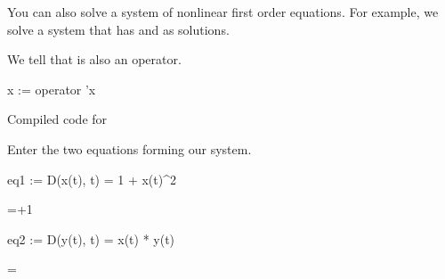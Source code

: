 {{{{{{{{{{{{{{{{You can also solve a system of nonlinear first order equations.
For example, we solve a system that has  and
 as solutions.

\begin{xtc}
\begin{xtccomment}
We tell \Language{} that  is also an operator.
\end{xtccomment}
\begin{spadsrc}
x := operator 'x
\end{spadsrc}
\begin{MessageOutput}
   Compiled code for %
\end{MessageOutput}
\begin{TeXOutput}
\begin{fricasmath}{4}
%
\end{fricasmath}
\end{TeXOutput}
\end{xtc}
\begin{xtc}
\begin{xtccomment}
Enter the two equations forming our system.
\end{xtccomment}
\begin{spadsrc}
eq1 := D(x(t), t) = 1 + x(t)^2
\end{spadsrc}
\begin{TeXOutput}
\begin{fricasmath}{5}
=+1%
\end{fricasmath}
\end{TeXOutput}
\end{xtc}
%
\begin{xtc}
\begin{xtccomment}
\end{xtccomment}
\begin{spadsrc}
eq2 := D(y(t), t) = x(t) * y(t)
\end{spadsrc}
\begin{TeXOutput}
\begin{fricasmath}{6}
=%
\TIMES {}%
\end{fricasmath}
\end{TeXOutput}
\end{xtc}
%
\begin{xtc}

\end{xtc}}}}}}}}}}}}}}}}}

